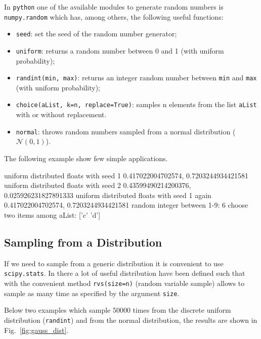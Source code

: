 In \texttt{python} one of the available modules to generate random numbers is \texttt{numpy.random} which has, among others, the following useful functions:
\begin{itemize}
\tightlist
\item \texttt{seed}: set the seed of the random number generator;
\item \texttt{uniform}: returns a random number between 0 and 1 (with uniform probability);
\item \texttt{randint(min,\ max)}: returns an integer random number between \texttt{min} and \texttt{max} (with uniform probability);
\item \texttt{choice(aList,\ k=n, replace=True)}: samples n elements from the list \texttt{aList} with or without replacement.
\item \texttt{normal}: throws random numbers sampled from a normal distribution ($\mathcal{N}(0, 1)$).
\end{itemize}

The following example show few simple applications.

\begin{ioutput}
uniform distributed floats with seed 1
0.417022004702574, 0.7203244934421581
uniform distributed floats with seed 2
0.43599490214200376, 0.025926231827891333
uniform distributed floats with seed 1 again
0.417022004702574, 0.7203244934421581
random integer between 1-9: 6
choose two items among aList: ['c' 'd']
\end{ioutput}

\subsection{Sampling from a Distribution}

If we need to sample from a generic distribution it is convenient to use \texttt{scipy.stats}. In there a lot of useful distribution have been defined such that with the convenient method \texttt{rvs(size=n)} (random variable sample) allows to sample as many time as specified by the argument \texttt{size}. 

Below two examples which sample 50000 times from the discrete uniform distribution (\texttt{randint}) and from the normal distribution, the results are shown in Fig.~\ref{fig:gauss_dist}.


